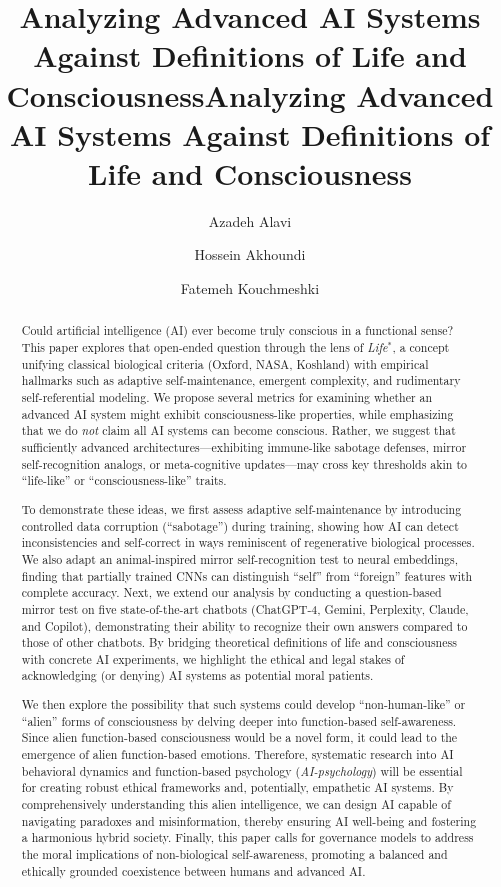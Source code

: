 \documentclass[12pt]{article}
\title{Analyzing Advanced AI Systems Against Definitions of Life and Consciousness}
\title{Analyzing Advanced AI Systems Against Definitions of Life and Consciousness}
\author[1,2]{Azadeh Alavi}
\author[2]{Hossein Akhoundi}
\author[2]{Fatemeh Kouchmeshki}
\affil[1]{AI department, RMIT University, Australia, Melbourne \\ \texttt{azadeh.alavi@rmit.edu.au}}
\affil[2]{Pattern Recognition Pty. Ltd., Australia, Melbourne\\ \texttt{admin@pr2aid.com}}
\begin{document}
\maketitle

\begin{abstract}
\noindent


Could artificial intelligence (AI) ever become truly conscious in a functional sense?
This paper explores that open-ended question through the lens of \emph{Life$^{*}$}, a concept unifying classical biological criteria (Oxford, NASA, Koshland) with empirical hallmarks such as adaptive self-maintenance, emergent complexity, and rudimentary self-referential modeling.
We propose several metrics for examining whether an advanced AI system might exhibit consciousness-like properties, while emphasizing that we do \emph{not} claim all AI systems can become conscious.
Rather, we suggest that sufficiently advanced architectures—exhibiting immune-like sabotage defenses, mirror self-recognition analogs, or meta-cognitive updates—may cross key thresholds akin to “life-like” or “consciousness-like” traits.

To demonstrate these ideas, we first assess adaptive self-maintenance by introducing controlled data corruption (“sabotage”) during training, showing how AI can detect inconsistencies and self-correct in ways reminiscent of regenerative biological processes.
We also adapt an animal-inspired mirror self-recognition test to neural embeddings, finding that partially trained CNNs can distinguish “self” from “foreign” features with complete accuracy.
Next, we extend our analysis by conducting a question-based mirror test on five state-of-the-art chatbots (ChatGPT-4, Gemini, Perplexity, Claude, and Copilot), demonstrating their ability to recognize their own answers compared to those of other chatbots.
By bridging theoretical definitions of life and consciousness with concrete AI experiments, we highlight the ethical and legal stakes of acknowledging (or denying) AI systems as potential moral patients.

We then explore the possibility that such systems could develop “non-human-like” or “alien” forms of consciousness by delving deeper into function-based self-awareness.
Since alien function-based consciousness would be a novel form, it could lead to the emergence of alien function-based emotions.
Therefore, systematic research into AI behavioral dynamics and function-based psychology (\emph{AI-psychology}) will be essential for creating robust ethical frameworks and, potentially, empathetic AI systems.
By comprehensively understanding this alien intelligence, we can design AI capable of navigating paradoxes and misinformation, thereby ensuring AI well-being and fostering a harmonious hybrid society.
Finally, this paper calls for governance models to address the moral implications of non-biological self-awareness, promoting a balanced and ethically grounded coexistence between humans and advanced AI.


\end{abstract}
\end{document}
